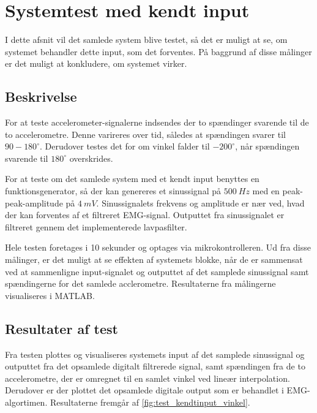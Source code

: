 \section{Systemtest med kendt input}
I dette afsnit vil det samlede system blive testet, så det er muligt at se, om systemet behandler dette input, som det forventes. På baggrund af disse målinger er det muligt at konkludere, om systemet virker. 

\subsection{Beskrivelse}
For at teste accelerometer-signalerne indsendes der to spændinger svarende til de to accelerometre. Denne varireres over tid, således at spændingen svarer til $90-180^{\circ}$. Derudover testes det for om vinkel falder til $-200^{\circ}$, når spændingen svarende til $180^{\circ}$ overskrides. 

For at teste om det samlede system med et kendt input benyttes en funktionsgenerator, så der kan genereres et sinussignal på $500~Hz$ med en peak-peak-amplitude på $4~mV$. Sinussignalets frekvens og amplitude er nær ved, hvad der kan forventes af et filtreret EMG-signal. Outputtet fra sinussignalet er filtreret gennem det implementerede lavpasfilter. 


Hele testen foretages i 10 sekunder og optages via mikrokontrolleren. Ud fra disse målinger, er det muligt at se effekten af systemets blokke, når de er sammensat ved at sammenligne input-signalet og outputtet af det samplede sinussignal samt spændingerne for det samlede acclerometre. Resultaterne fra målingerne visualiseres i MATLAB. 


\subsection{Resultater af test}
Fra testen plottes og visualiseres systemets input af det samplede sinussignal og outputtet fra det opsamlede digitalt filtrerede signal, samt spændingen fra de to accelerometre, der er omregnet til en samlet vinkel ved lineær interpolation. Derudover er der plottet det opsamlede digitale output som er behandlet i EMG-algortimen. Resultaterne fremgår af \autoref{fig:test_kendtinput_vinkel}. 

